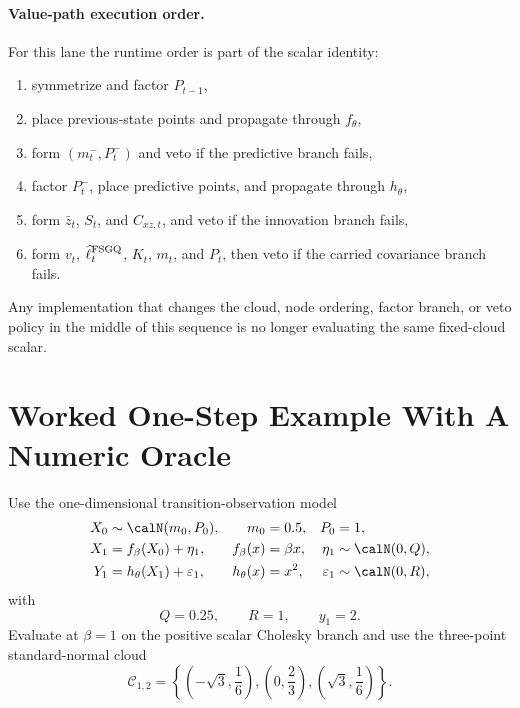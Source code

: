 \paragraph{Value-path execution order.}
For this lane the runtime order is part of the scalar identity:
\begin{enumerate}[leftmargin=0.28in]
  \item symmetrize and factor \(P_{t-1}\),
  \item place previous-state points and propagate through \(f_\theta\),
  \item form \((m_t^-,P_t^-)\) and veto if the predictive branch fails,
  \item factor \(P_t^-\), place predictive points, and propagate through
  \(h_\theta\),
  \item form \(\bar z_t\), \(S_t\), and \(C_{xz,t}\), and veto if the
  innovation branch fails,
  \item form \(v_t\), \(\widehat\ell_t^{\rm FSGQ}\), \(K_t\), \(m_t\), and
  \(P_t\), then veto if the carried covariance branch fails.
\end{enumerate}
Any implementation that changes the cloud, node ordering, factor branch, or
veto policy in the middle of this sequence is no longer evaluating the same
fixed-cloud scalar.

\section{Worked One-Step Example With A Numeric Oracle}
\label{sec:bf-hd-sgqf-worked-example}

Use the one-dimensional transition-observation model
\begin{align}
  X_0 &\sim \calN(m_0,P_0),
  &m_0&=0.5,
  &P_0&=1,
  \label{eq:bf-hd-sgqf-example-initial}\\
  X_1 &= f_\beta(X_0)+\eta_1,
  &f_\beta(x)&=\beta x,
  &\eta_1&\sim \calN(0,Q),
  \label{eq:bf-hd-sgqf-example-transition}\\
  Y_1 &= h_\theta(X_1)+\varepsilon_1,
  &h_\theta(x)&=x^2,
  &\varepsilon_1&\sim \calN(0,R),
  \label{eq:bf-hd-sgqf-example-observation}
\end{align}
with
\begin{equation}
  Q=0.25,
  \qquad
  R=1,
  \qquad
  y_1=2.
  \label{eq:bf-hd-sgqf-example-QRy}
\end{equation}
Evaluate at \(\beta=1\) on the positive scalar Cholesky branch and use the
three-point standard-normal cloud
\begin{equation}
  \mathcal C_{1,2}
  =
  \left\{
  \left(-\sqrt3,\frac16\right),
  \left(0,\frac23\right),
  \left(\sqrt3,\frac16\right)
  \right\}.
  \label{eq:bf-hd-sgqf-example-cloud}
\end{equation}

